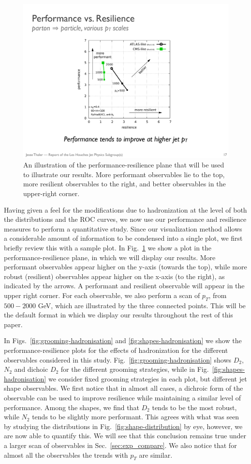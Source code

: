 \documentclass[11pt,letterpaper]{article}
\DeclareRobustCommand{\Sec}[1]{Sec.~\ref{#1}}
\DeclareRobustCommand{\Fig}[1]{Fig.~\ref{#1}}
\DeclareRobustCommand{\Figs}[2]{Figs.~\ref{#1} and \ref{#2}}
\begin{document}
\begin{figure}
\begin{center}
\includegraphics[width=0.4\columnwidth]{figures/sweep_pt}
\end{center}
\caption{An illustration of the performance-resilience plane that will be used to illustrate our results. More performant observables lie to the top, more resilient observables to the right, and better observables in the upper-right corner.}
\label{fig:sweep_pt}
\end{figure}



Having given a feel for the modifications due to hadronization at the level of both the distributions and the ROC curves, we now use our performance and resilience measures to perform a quantitative study. Since our visualization method allows a considerable amount of information to be condensed into a single plot, we first briefly review this with a sample plot. In \Fig{fig:sweep_pt} we show a plot in the performance-resilience plane, in which we will display our results. More performant observables appear higher on the y-axis (towards the top), while more robust (resilient) observables appear higher on the x-axis (to the right), as indicated by the arrows. A performant and resilient observable will appear in the upper right corner. For each observable, we also perform a scan of $p_T$, from $500-2000$ GeV, which are illustrated by the three connected points. This will be the default format in which we display our results throughout the rest of this paper.



In \Figs{fig:grooming-hadronisation}{fig:shapes-hadronisation} we show the performance-resilience plots for the effects of hadronization for the different observables considered in this study. \Fig{fig:grooming-hadronisation} shows $D_2$, $N_2$ and dichoic $D_2$ for the different grooming strategies, while in \Fig{fig:shapes-hadronisation} we consider fixed grooming strategies in each plot, but different jet shape observables. We first notice that in almost all cases, a dichroic form of the observable can be used to improve resilience while maintaining a similar level of performance. Among the shapes, we find that $D_2$ tends to be the most robust, while $N_2$ tends to be slightly more performant. This agrees with what was seen by studying the distributions in \Fig{fig:shape-distribution} by eye, however, we are now able to quantify this. We will see that this conclusion remains true under a larger scan of observables in \Sec{sec:exp_compare}. We also notice that for almost all the observables the trends with $p_T$ are similar.
\end{document}
